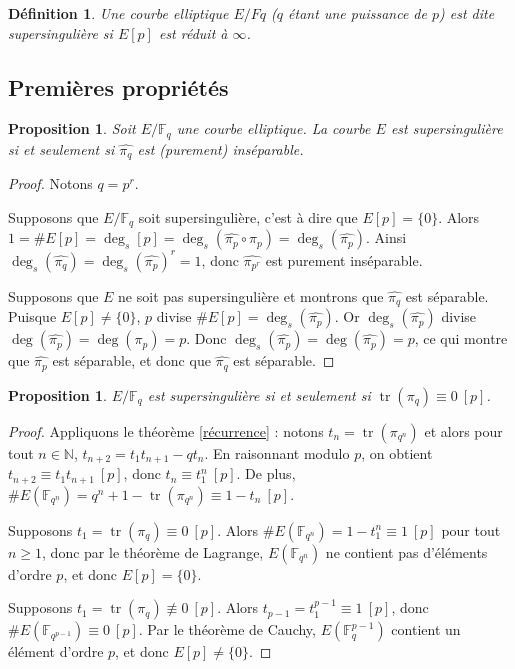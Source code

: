 \documentclass{article}
\theoremstyle{plain}%
\newtheorem{prop}[thm]{Proposition}
\newtheorem{deff}[thm]{Définition}
\theoremstyle{definition}%
\newcommand{\F}{\mathbb{F}}
\newcommand{\N}{\mathbb{N}}
\newcommand{\h}{\widehat}
\DeclareMathOperator{\tr}{tr}
\begin{document}
\begin{deff}
  Une courbe elliptique $E/Fq$ ($q$ étant une puissance de $p$) est dite supersingulière si $E[p]$ est réduit à $\infty$. 
\end{deff}

\subsection{Premières propriétés}

\begin{prop}
  \label{pihatsep}
  Soit $E/\F_q$ une courbe elliptique. La courbe $E$ est supersingulière si et seulement si $\widehat{\pi_q}$ est (purement) inséparable.
\end{prop}

\begin{proof}
  Notons $q = p^r$. 

  Supposons que $E/\F_q$ soit supersingulière, c'est à dire que $E[p] = \{0\}$. Alors $1 = \#E[p] = \deg_s[p] = \deg_s(\h{\pi_{p}} \circ \pi_{p}) = \deg_s(\h{\pi_{p}})$. Ainsi $\deg_s(\h{\pi_{q}}) =  \deg_s(\h{\pi_{p}})^r= 1$, donc $\h{\pi_{p^r}}$ est purement inséparable.

  Supposons que $E$ ne soit pas supersingulière et montrons que $\h{\pi_{q}}$ est séparable. Puisque $E[p] \neq \{0\}$, $p$ divise $\#E[p] = \deg_s(\h{\pi_p})$. Or $\deg_s(\h{\pi_p})$ divise $\deg(\h{\pi_p}) = \deg({\pi_p}) = p$. Donc $\deg_s(\h{\pi_p}) = \deg(\h{\pi_p}) =p$, ce qui montre que $\h{\pi_p}$ est séparable, et donc que $\h{\pi_q}$ est séparable.
\end{proof}

\begin{prop}
  \label{pimodp}
  $E/\F_q$ est supersingulière si et seulement si $\tr(\pi_q) \equiv 0\ [p]$. 
\end{prop}

\begin{proof}
  Appliquons le théorème \ref{récurrence} : 
  notons $t_n = \tr(\pi_{q^n})$ 
  et alors pour tout $n\in\N$, 
  $t_{n+2} = t_1 t_{n+1} -qt_n$.
  En raisonnant modulo $p$, on obtient $t_{n+2} \equiv t_1 t_{n+1}\ [p]$, donc $t_n \equiv t_1^n\ [p]$. 
  De plus, $\#E(\F_{q^n}) = q^n + 1 - \tr(\pi_{q^n}) \equiv 1 - t_n\ [p]$.

Supposons $t_1 = \tr(\pi_q) \equiv 0\ [p]$. 
Alors $\#E(\F_{q^n}) = 1 - t_1^n \equiv 1\ [p]$ pour tout $n \ge 1$, donc par le théorème de Lagrange, $E(\F_{q^n})$ ne contient pas d’éléments d’ordre $p$, et donc $E[p] = \{0\}$.

Supposons $t_1 = \tr(\pi_q) \not\equiv 0\ [p]$. 
Alors $t_{p-1} = t_1^{p-1} \equiv 1\ [p]$, donc $\#E(\F_{q^{p-1}}) \equiv 0\ [p]$. Par le théorème de Cauchy, $E(\F_q^{p-1})$ contient un élément d’ordre $p$, et donc $E[p] \neq  \{0\}$.
\end{proof}
\end{document}
